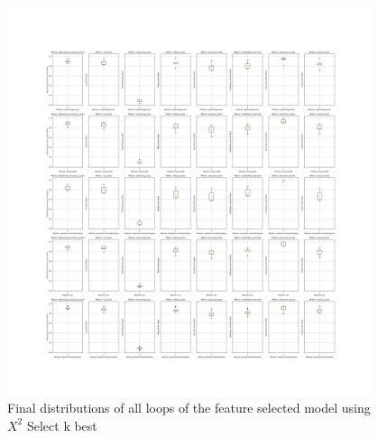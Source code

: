 \documentclass[12pt, a4paper]{article}
\begin{document}
\begin{figure}[H]
    \begin{center}
        \includegraphics[width=0.95\textwidth]{figures/RNCV/Bonus/All loop outer folds boxplots.png}
        \caption{Final distributions of all loops of the feature selected model using $X^2$ Select k best}\label{fig:bonus}
    \end{center}
\end{figure}
\end{document}
